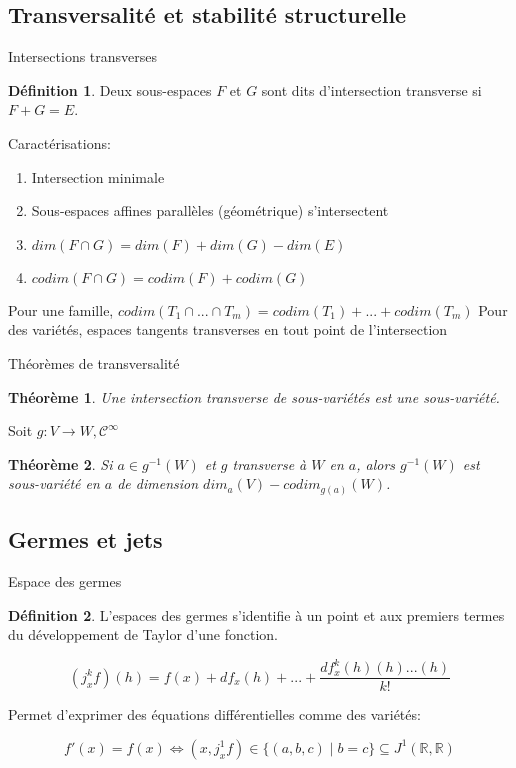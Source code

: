 \documentclass[compress]{beamer}
\newcommand{\cinf}{\mathcal{C}^\infty}
\newcommand{\R}{\mathbb{R}}
\newtheorem{thm}{Théorème}
\theoremstyle{definition}
\newtheorem{defn}{Définition}
\begin{document}
\subsection{Transversalité et stabilité structurelle}
\begin{frame}{Intersections transverses}
    \begin{defn}
        Deux sous-espaces $F$ et $G$ sont dits d'intersection transverse si $F+G=E$.
    \end{defn}
    \pause
    Caractérisations:
    \begin{enumerate}
        \item<2-5> Intersection minimale
        \item<2-5> Sous-espaces affines parallèles (géométrique) s'intersectent
        \item<3-5> $dim(F\cap G)=dim(F)+dim(G)-dim(E)$
        \item<3-5> $codim(F\cap G)=codim(F)+codim(G)$
    \end{enumerate}
    \pause[4]
    Pour une famille, $codim(T_1\cap...\cap T_m)=codim(T_1)+...+codim(T_m)$
    \pause[5]
    Pour des variétés, espaces tangents transverses en tout point de l'intersection
\end{frame}

\begin{frame}{Théorèmes de transversalité}
    \begin{thm}
        Une intersection transverse de sous-variétés est une sous-variété.
    \end{thm}
    \pause
    Soit $g:V\to W, \cinf$
    \begin{thm}
        Si $a\in g^{-1}(W)$ et $g$ transverse à $W$ en $a$, alors $g^{-1}(W)$ est sous-variété en $a$ de dimension $dim_a(V)-codim_{g(a)}(W)$.
    \end{thm}
\end{frame}

\subsection{Germes et jets}
\begin{frame}{Espace des germes}
    \begin{defn}
        L'espaces des germes s'identifie à un point et aux premiers termes du développement de Taylor d'une fonction.

        $$(j^k_x f)(h) = f(x) + df_x(h)+...+\frac{df^k_x(h)(h)...(h)}{k!}$$
    \end{defn}
    \pause
    Permet d'exprimer des équations différentielles comme des variétés:

    $$f'(x)=f(x) \iff (x,j^1_xf) \in \{(a,b,c) \mid b=c \} \subseteq J^1(\R,\R)$$
\end{frame}
\end{document}
